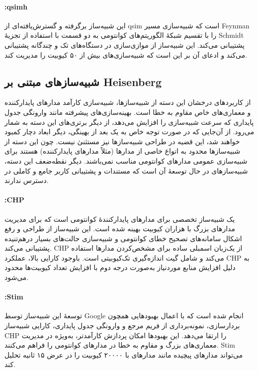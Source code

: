 \paragraph{:qsimh}
این شبیه‌ساز برگرفته و گسترش‌یافته‌ای از qsim است که شبیه‌سازی مسیر Feynman را با تقسیم شبکهٔ الگوریتم‌های کوانتومی به دو قسمت با استفاده از تجزیهٔ Schmidt پشتیبانی می‌کند. این شبیه‌ساز از موازی‌سازی در دستگاه‌های تک و چندگانه پشتیبانی می‌کند و ادعای آن بر این است که شبیه‌سازی‌های بیش از ۵۰ کیوبیت را مدیریت کند.

\subsection{شبیه‌سازهای مبتنی بر Heisenberg}
از کاربردهای درخشان این دسته از شبیه‌سازها، شبیه‌سازی کارآمد مدارهای پایدارکننده و معماری‌های خاص مقاوم به خطا است. بهینه‌سازی‌های پیشرفته مانند وارونگی جدول پایداری که سرعت شبیه‌سازی را افزایش می‌دهد، از دیگر برتری‌های این دسته به شمار می‌رود. از آن‌جایی که در صورت توجه خاص به یک بعد از بهینگی، دیگر ابعاد دچار کمبود خواهند شد، این قضیه در طراحی شبیه‌سازها نیز مستثنیٰ نیست. چون این دسته از شبیه‌سازها محدود به انواع خاصی از مدارها (مثلاً مدارهای پایدارکننده) هستند برای شبیه‌سازی عمومی مدارهای کوانتومی مناسب نمی‌باشند. دیگر نقطه‌ضعف این دسته، شبیه‌سازهای در حال توسعهٔ آن است که مستندات و پشتیبانی کاربر جامع و کاملی در دسترس ندارند.

\paragraph{:CHP}
یک شبیه‌ساز تخصصی برای مدارهای پایدارکنندهٔ کوانتومی است که برای مدیریت مدارهای بزرگ با هزاران کیوبیت بهینه شده است. این شبیه‌ساز از طراحی و رفع اشکال سامانه‌های تصحیح خطای کوانتومی و شبیه‌سازی حالت‌های بسیار درهم‌تنیده پشتیبانی می‌کند. CHP از یک‌زبان اسمبلی ساده برای مشخص‌کردن مدارها استفاده می‌کند و شامل گیت اندازه‌گیری تک‌کیوبیتی است. باوجود کارایی بالا، عملکرد CHP به دلیل افزایش منابع موردنیاز به‌صورت درجه دوم با افزایش تعداد کیوبیت‌ها محدود می‌شود.

\paragraph{:Stim}
توسعهٔ این شبیه‌ساز توسط Google انجام شده است که با اعمال بهبودهایی همچون بردارسازی، نمونه‌برداری از فریم مرجع و وارونگی جدول پایداری، کارایی شبیه‌ساز CHP را ارتقا می‌دهد. این بهبودها امکان پردازش کارآمدتر، به‌ویژه در مدیریت معماری‌های بزرگ و مقاوم به خطا در مدارهای کوانتومی را فراهم می‌کنند. Stim می‌تواند مدارهای پیچیده مانند مدارهای  با ۲۰۰۰۰ کیوبیت را در عرض ۱۵ ثانیه تحلیل کند.

